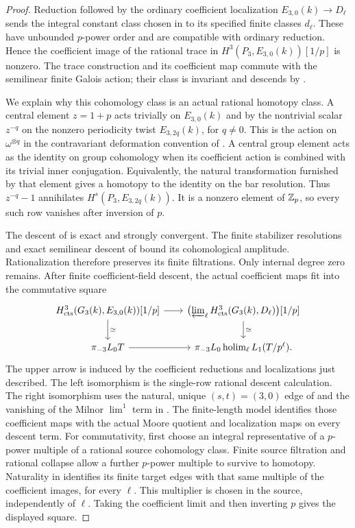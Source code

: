 \begin{proof}
Reduction followed by the ordinary coefficient localization
$E_{3,0}(k)\to D_\ell$ sends the integral constant class chosen in
 to its specified finite classes
$d_\ell$.  These have unbounded $p$-power order and are compatible
with ordinary reduction.  Hence the coefficient image of the
rational trace in $H^3(P_3,E_{3,0}(k))[1/p]$ is nonzero.
The trace construction and its coefficient map commute with the
semilinear finite Galois action; their class is invariant and
descends by .

We explain why this cohomology class is an actual rational
homotopy class.  A central element $z=1+p$ acts trivially on
$E_{3,0}(k)$ and by the nontrivial scalar $z^{-q}$ on the
nonzero periodicity twist $E_{3,2q}(k)$, for $q\ne0$.
This is the action on $\omega^{\otimes q}$ in the
contravariant deformation convention of
.  A central group element acts as the
identity on group cohomology when its coefficient action is
combined with its trivial inner conjugation.  Equivalently,
the natural transformation furnished by that element gives
a homotopy to the identity on the bar resolution.  Thus
$z^{-q}-1$ annihilates
$H^s(P_3,E_{3,2q}(k))$.  It is a nonzero element of $\mathbb Z_p$,
so every such row vanishes after inversion of $p$.

The descent of  is exact and strongly
convergent.  The finite stabilizer resolutions and exact semilinear
descent of 
bound its cohomological amplitude.
Rationalization therefore preserves its finite filtrations.
Only internal degree zero remains.  After finite coefficient-field
descent, the actual coefficient maps fit into the commutative square
\[
\begin{tikzcd}[column sep=2em]
 H^3_{\hthreects}(G_3(k),E_{3,0}(k))[1/p]
   \arrow[r] \arrow[d,"\simeq"]
 & \bigl(\varprojlim_\ell
       H^3_{\hthreects}(G_3(k),D_\ell)\bigr)[1/p]
   \arrow[d,"\simeq"] \\
 \pi_{-3}L_0T \arrow[r]
 & \pi_{-3}L_0\operatorname*{holim}_\ell L_1(T/p^\ell).
\end{tikzcd}
\]
The upper arrow is induced by the coefficient reductions and
localizations just described.  The left isomorphism is the
single-row rational descent calculation.  The right isomorphism
uses the natural, unique $(s,t)=(3,0)$ edge of
 and the vanishing of the Milnor
$\lim^1$ term in .  The finite-length
model identifies those coefficient maps with the actual Moore
quotient and localization maps on every descent term.
For commutativity, first choose an integral representative of a
$p$-power multiple of a rational source cohomology class.
Finite source filtration and rational collapse allow a further
$p$-power multiple to survive to homotopy.  Naturality in
 identifies its finite target edges
with that same multiple of the coefficient images, for every
$\ell$.  This multiplier is chosen in the source, independently
of $\ell$.  Taking the coefficient limit and then inverting $p$
gives the displayed square.


\end{proof}
